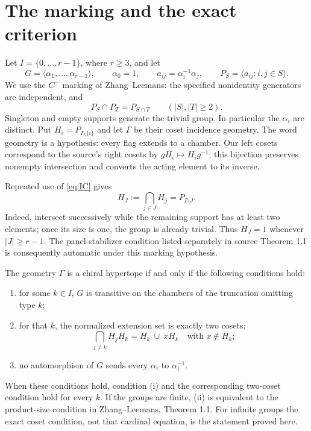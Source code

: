 \section{The marking and the exact criterion}
Let $I=\{0,\ldots,r-1\}$, where $r\geq3$, and let
\[
 G=\langle\alpha_1,\ldots,\alpha_{r-1}\rangle,
 \qquad\alpha_0=1,\qquad a_{ij}=\alpha_i^{-1}\alpha_j,
 \qquad P_S=\langle a_{ij}:i,j\in S\rangle.
\]
We use the $C^+$ marking of Zhang--Leemans: the specified nonidentity generators are independent, and
\begin{equation}\label{eq:IC}
                 P_S\cap P_T=P_{S\cap T}
                  \qquad(|S|,|T|\geq2).
\end{equation}
Singleton and empty supports generate the trivial group. In particular the $\alpha_i$ are distinct. Put $H_i=P_{I\setminus\{i\}}$ and let $\Gamma$ be their coset incidence geometry. The word geometry is a hypothesis: every flag extends to a chamber. Our left cosets correspond to the source's right cosets by $gH_i\mapsto H_i g^{-1}$; this bijection preserves nonempty intersection and converts the acting element to its inverse.

Repeated use of \eqref{eq:IC} gives
\begin{equation}\label{eq:parabolics}
              H_J:=\bigcap_{j\in J}H_j=P_{I\setminus J}.
\end{equation}
Indeed, intersect successively while the remaining support has at least two elements; once its size is one, the group is already trivial. Thus $H_J=1$ whenever $|J|\geq r-1$. The panel-stabilizer condition listed separately in source Theorem 1.1 is consequently automatic under this marking hypothesis.

\begin{theorem}\label{thm:criterion}
The geometry $\Gamma$ is a chiral hypertope if and only if the following conditions hold:
\begin{enumerate}[label=(\roman*)]
\item for some $k\in I$, $G$ is transitive on the chambers of the truncation omitting type $k$;
\item for that $k$, the normalized extension set is exactly two cosets:
\begin{equation}\label{eq:twocosets}
 \bigcap_{j\ne k}H_jH_k=H_k\ \dot\cup\ xH_k
                         \quad\text{with }x\notin H_k;
\end{equation}
\item no automorphism of $G$ sends every $\alpha_i$ to $\alpha_i^{-1}$.
\end{enumerate}
When these conditions hold, condition (i) and the corresponding two-coset condition hold for every $k$. If the groups are finite, (ii) is equivalent to the product-size condition in Zhang--Leemans, Theorem 1.1. For infinite groups the exact coset condition, not that cardinal equation, is the statement proved here.
\end{theorem}

